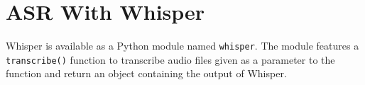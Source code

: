 \section{ASR With Whisper}

Whisper is available as a Python module named \texttt{whisper}\cite{pypi-whis}.
The module features a \texttt{transcribe()} function to transcribe audio files given as a parameter to the function and return an object containing the output of Whisper.

